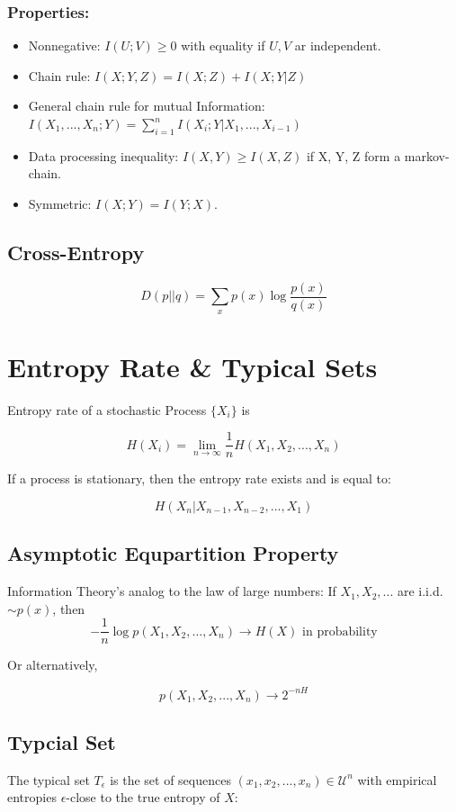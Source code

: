 \documentclass[10pt,a4paper,landscape]{article}
\newcommand{\alphabet}{\mathcal{U}}
\begin{document}
\begin{multicols*}{4}
\subsubsection{Properties:}
\begin{itemize}
	\item Nonnegative: $I(U;V) \geq 0$ with equality if $U, V$ ar independent.
	\item Chain rule: $I(X; Y, Z) = I(X;Z) + I(X; Y | Z)$
	\item General chain rule for mutual Information: $I(X_1, ..., X_n; Y) = \sum_{i=1}^n I(X_i; Y | X_1, ..., X_{i-1})$
	\item Data processing inequality: $I(X,Y) \geq I(X, Z)$ if X, Y, Z form a markov-chain.
	\item Symmetric: $I(X;Y) = I(Y;X)$.
\end{itemize}

\subsection{Cross-Entropy}
$$ D(p || q) = \sum_x p(x) \log \frac{p(x)}{q(x)}$$

\section{Entropy Rate \& Typical Sets}
Entropy rate of a stochastic Process $\{X_i\}$ is

$$H(X_i) = \lim_{n \rightarrow \infty} \frac{1}{n} H(X_1, X_2, ..., X_n)$$

If a process is stationary, then the entropy rate exists and is equal to:

$$H(X_n | X_{n-1}, X_{n-2}, ..., X_1)$$

\subsection{Asymptotic Equpartition Property}
Information Theory's analog to the law of large numbers: If $X_1, X_2, ...$ are i.i.d. $\sim p(x)$, then
$$ - \frac{1}{n} \log p(X_1, X_2, ..., X_n) \rightarrow H(X) \text{ in probability}$$

Or alternatively,

$$ p(X_1, X_2, ..., X_n) \rightarrow 2^{-n H}$$

\subsection{Typcial Set}
The typical set $T_\epsilon$ is the set of sequences $(x_1, x_2, ..., x_n) \in \alphabet^n$ with empirical entropies $\epsilon$-close to the true entropy of $X$:


\end{multicols*}
\end{document}
